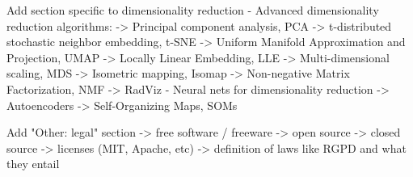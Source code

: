 \documentclass{article}
\begin{document}
Add section specific to dimensionality reduction
- Advanced dimensionality reduction algorithms:
-> Principal component analysis, PCA
-> t-distributed stochastic neighbor embedding, t-SNE 
-> Uniform Manifold Approximation and Projection, UMAP
-> Locally Linear Embedding, LLE
-> Multi-dimensional scaling, MDS
-> Isometric mapping, Isomap
-> Non-negative Matrix Factorization, NMF
-> RadViz
- Neural nets for dimensionality reduction
-> Autoencoders
-> Self-Organizing Maps, SOMs

Add "Other: legal" section
-> free software / freeware
-> open source
-> closed source
-> licenses (MIT, Apache, etc)
-> definition of laws like RGPD and what they entail
\end{document}
